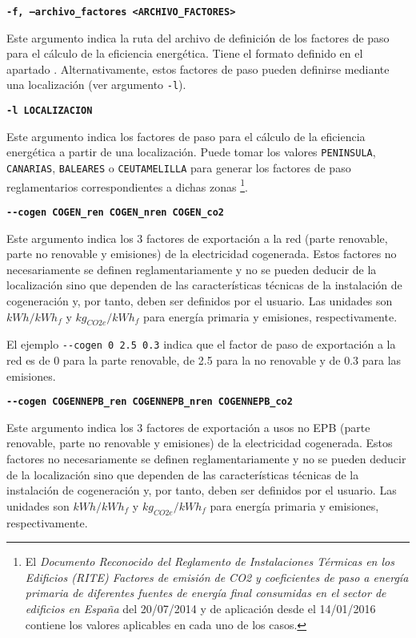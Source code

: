 \documentclass[10pt,notitlepage,oneside,a4paper]{article}
\begin{document}
\textbf{\texttt{-f, --archivo\_factores <ARCHIVO\_FACTORES>}}

Este argumento indica la ruta del archivo de definición de los factores de paso para el cálculo de la eficiencia energética. Tiene el formato definido en el apartado .
Alternativamente, estos factores de paso pueden definirse mediante una localización (ver argumento \texttt{-l}).

\textbf{\texttt{-l LOCALIZACION}}

Este argumento indica los factores de paso para el cálculo de la eficiencia energética a partir de una localización. Puede tomar los valores \texttt{PENINSULA}, \texttt{CANARIAS}, \texttt{BALEARES} o \texttt{CEUTAMELILLA} para generar los factores de paso reglamentarios correspondientes a dichas zonas \footnote{El \textit{Documento Reconocido del Reglamento de Instalaciones Térmicas en los Edificios (RITE) Factores de emisión de CO2 y coeficientes de paso a energía primaria de diferentes fuentes de energía final consumidas en el sector de edificios en España} del 20/07/2014 y de aplicación desde el 14/01/2016 contiene los valores aplicables en cada uno de los casos.}.

\textbf{\texttt{-{}-cogen COGEN\_ren COGEN\_nren COGEN\_co2}}

Este argumento indica los 3 factores de exportación a la red (parte renovable, parte no renovable y emisiones) de la electricidad cogenerada. Estos factores no necesariamente se definen reglamentariamente y no se pueden deducir de la localización sino que dependen de las características técnicas de la instalación de cogeneración y, por tanto, deben ser definidos por el usuario. Las unidades son $kWh/kWh_f$ y $kg_{CO2e}/kWh_f$ para energía primaria y emisiones, respectivamente.

El ejemplo \texttt{-{}-cogen 0 2.5 0.3} indica que el factor de paso de exportación a la red es de 0 para la parte renovable, de 2.5 para la no renovable y de 0.3 para las emisiones.

\textbf{\texttt{-{}-cogen COGENNEPB\_ren COGENNEPB\_nren COGENNEPB\_co2}}

Este argumento indica los 3 factores de exportación a usos no EPB (parte renovable, parte no renovable y emisiones) de la electricidad cogenerada. Estos factores no necesariamente se definen reglamentariamente y no se pueden deducir de la localización sino que dependen de las características técnicas de la instalación de cogeneración y, por tanto, deben ser definidos por el usuario. Las unidades son $kWh/kWh_f$ y $kg_{CO2e}/kWh_f$ para energía primaria y emisiones, respectivamente.
\end{document}
